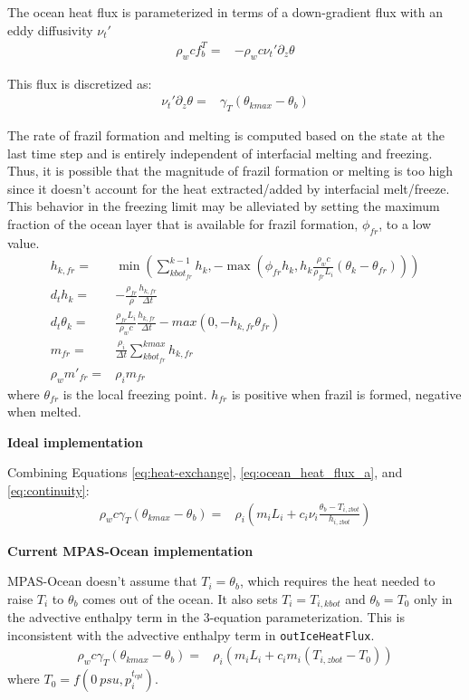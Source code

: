 \documentclass[11pt]{report}
\newcommand{\bea}{\begin{eqnarray}}
\newcommand{\eea}{\end{eqnarray}}
\begin{document}
The ocean heat flux is parameterized in terms of a down-gradient flux with an eddy diffusivity $\nu_t'$
\bea
    \rho_w c f_b^T =& -\rho_w c \nu_t' \partial_z \theta
\eea

This flux is discretized as:
\bea
    \nu_t' \partial_z \theta =& \gamma_T(\theta_{kmax} - \theta_b)\label{eq:heat-exchange}
\eea

The rate of frazil formation and melting is computed based on the state at the last time step and is entirely independent of interfacial melting and freezing. Thus, it is possible that the magnitude of frazil formation or melting is too high since it doesn't account for the heat extracted/added by interfacial melt/freeze. This behavior in the freezing limit may be alleviated by setting the maximum fraction of the ocean layer that is available for frazil formation, $\phi_{fr}$, to a low value.
\bea
    h_{k,fr} =& \min(\sum_{kbot_{fr}}^{k-1} h_k, -\max(\phi_{fr} h_k, h_k \frac{\rho_w c}{\rho_{fr} L_i} (\theta_k - \theta_{fr})))\\
    d_t h_k =& -\frac{\rho_{fr}}{\rho} \frac{h_{k,fr}}{\Delta t}\\
    d_t \theta_k =&  \frac{\rho_{fr} L_i}{\rho_w c} \frac{h_{k,fr}}{\Delta t} - max(0, -h_{k,fr} \theta_{fr})\\
    m_{fr} =& \frac{\rho_i}{\Delta t} \sum_{kbot_{fr}}^{kmax} h_{k,fr}\\ %
    \rho_w m'_{fr} =& \rho_i m_{fr}
\eea
where $\theta_{fr}$ is the local freezing point. $h_{fr}$ is positive when frazil is formed, negative when melted.

\textbf{Ideal implementation}

Combining Equations \ref{eq:heat-exchange}, \ref{eq:ocean_heat_flux_a}, and \ref{eq:continuity}:
\bea
    \rho_w c \gamma_T(\theta_{kmax} - \theta_b) =& \rho_i( m_i L_i + c_i \nu_i \frac{\theta_b - T_{i,zbot}}{h_{i,zbot}})\label{eq:3eqn-heat}
\eea

\textbf{Current MPAS-Ocean implementation}

MPAS-Ocean doesn't assume that $T_i = \theta_b$, which requires the heat needed to raise $T_i$ to $\theta_b$ comes out of the ocean. It also sets $T_i = T_{i,kbot}$ and $\theta_b = T_0$ only in the advective enthalpy term in the 3-equation parameterization. This is inconsistent with the advective enthalpy term in \texttt{outIceHeatFlux}.
\bea
    \rho_w c \gamma_T(\theta_{kmax} - \theta_b) =& \rho_i( m_i L_i + c_i m_i (T_{i,zbot} - T_0))\label{eq:3eqn-heat}
\eea
where $T_0 =f(0\:psu, p_i^{t_{cpl}})$.
\end{document}
